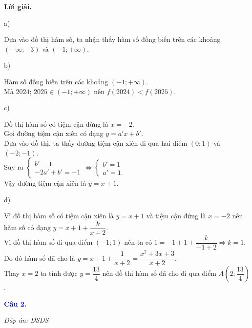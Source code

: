 \documentclass[12pt,a4paper]{article}
\begin{document}
\noindent\textbf{Lời giải.}

a)  %

Dựa vào đồ thị hàm số, ta nhận thấy hàm số đồng biến trên các khoảng $(-\infty;-3)$ và $\left(-1;+\infty\right)$.			
			
b)  %

			Hàm số đồng biến trên các khoảng  $\left(-1;+\infty\right)$.\\

Mà $2024$; $2025 \in \left(-1;+\infty\right)$  nên $f(2024)<f(2025)$.			
			
c)  %

Đồ thị hàm số có tiệm cận đứng là $x=-2$.\\

Gọi đường tiệm cận xiên có dạng $y=a'x+b'$.\\

Dựa vào đồ thị, ta thấy đường tiệm cận xiên đi qua hai điểm $(0;1)$ và $(-2;-1)$.\\

Suy ra $\begin{cases}b'=1\\-2a'+b'=-1\end{cases} \Leftrightarrow \begin{cases}b'=1\\a'=1.\end{cases}$\\

Vậy đường tiệm cận xiên là $y=x+1$.

d)  %

	Vì đồ thị hàm số có tiệm cận xiên là $y=x+1$ và tiệm cận đứng là $x=-2$ nên hàm số có dạng $y=x+1+\dfrac{k}{x+2}$.\\

	Vì đồ thị hàm số đi qua điểm $(-1;1)$ nên ta có $1=-1+1+\dfrac{k}{-1+2}\Rightarrow k=1$.\\

	Do đó hàm số đã cho là $y=x+1+\dfrac{1}{x+2}=\dfrac{x^2+3x+3}{x+2}$.\\

	Thay $x=2$ ta tính được $y=\dfrac{13}{4}$ nên đồ thị hàm số đã cho đi qua điểm $A\left(2;\dfrac{13}{4}\right)$.

\medskip
\noindent\textcolor{blue}{\textbf{Câu 2.}}

\noindent \textit{Đáp án: ĐSĐS}
\end{document}
